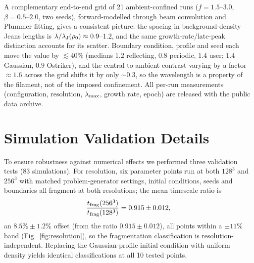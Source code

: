 \documentclass[usenatbib,twoside,twocolumn]{mnras}
\begin{document}
A complementary end-to-end grid of 21 ambient-confined runs ($f=1.5$--$3.0$, $\beta=0.5$--$2.0$, two seeds), forward-modelled through beam convolution and Plummer fitting, gives a consistent picture: the spacing in background-density Jeans lengths is $\lambda/\lambda_{\rm J}(\rho_0)\approx0.9$--$1.2$, and the same growth-rate/late-peak distinction accounts for its scatter. Boundary condition, profile and seed each move the value by $\lesssim40\%$ (medians $1.2$ reflecting, $0.8$ periodic, $1.4$ user; $1.4$ Gaussian, $0.9$ Ostriker), and the central-to-ambient contrast varying by a factor $\approx1.6$ across the grid shifts it by only $\sim0.3$, so the wavelength is a property of the filament, not of the imposed confinement. All per-run measurements (configuration, resolution, $\lambda_{\rm max}$, growth rate, epoch) are released with the public data archive.

\section{Simulation Validation Details}
\label{sec:validation}

To ensure robustness against numerical effects we performed three validation tests (83 simulations). For resolution, six parameter points run at both $128^3$ and $256^3$ with matched problem-generator settings, initial conditions, seeds and boundaries all fragment at both resolutions; the mean timescale ratio is
\begin{equation}
\frac{t_{\rm frag}(256^3)}{t_{\rm frag}(128^3)} = 0.915 \pm 0.012,
\end{equation}
an $8.5\%\pm1.2\%$ offset (from the ratio $0.915\pm0.012$), all points within a $\pm11\%$ band (Fig.~\ref{fig:resolution}), so the fragmentation classification is resolution-independent. Replacing the Gaussian-profile initial condition with uniform density yields identical classifications at all 10 tested points.
\end{document}
